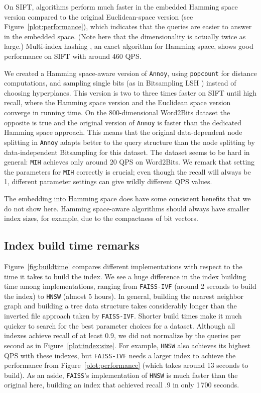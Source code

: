 On \textsf{SIFT}, algorithms perform much faster 
in the embedded Hamming space version compared to
the original Euclidean-space version (see Figure~\ref{plot:performance}), which indicates that the queries are 
easier to answer in the embedded space. (Note here that the dimensionality is actually twice as large.)  
Multi-index
hashing \cite{mihalgo}, an exact algorithm for Hamming space, shows good performance on \textsf{SIFT} with around 460 QPS.


We created a Hamming space-aware version of \texttt{Annoy}, using
\texttt{popcount} for distance computations, and sampling single bits 
(as in Bitsampling LSH \cite{IndykM98}) instead of choosing hyperplanes. This version is two to three times faster on \textsf{SIFT} until high recall, where the Hamming space version and the Euclidean space version converge in running time.  
On the 800-dimensional \textsf{Word2Bits} dataset the opposite is true and the original version of \texttt{Annoy} is faster than the dedicated Hamming space approach. This means that the original data-dependent node splitting in \texttt{Annoy} adapts better to the query structure than the node splitting by data-independent Bitsampling for this dataset. The dataset seems to be hard in general: \texttt{MIH} achieves only around 20 QPS on \textsf{Word2Bits}.
We remark that setting the parameters for \texttt{MIH} correctly is crucial;
even though the recall will always be 1, different parameter settings can give
wildly different QPS values.

The embedding into Hamming space does have some consistent benefits that we do
not show here. Hamming space-aware algorithms should always have smaller index
sizes, for example, due to the compactness of bit vectors.

\subsection{Index build time remarks}
\label{sec:build:time}

Figure~\ref{fig:buildtime} compares different implementations with respect to the time it takes to build the index. We see a huge difference in the index building time among implementations, ranging from \texttt{FAISS-IVF} (around 2 seconds to build the index) to \texttt{HNSW} (almost 5 hours). In general, building the nearest neighbor graph and building a tree data structure takes considerably longer than the inverted file approach taken by \texttt{FAISS-IVF}. Shorter build times make it much quicker to search for the best parameter choices for a dataset. Although all indexes achieve recall of at least 0.9, we did not normalize by the queries per second as in Figure~\ref{plot:index:size}. For example, \texttt{HNSW} also achieves its highest QPS with these indexes, but \texttt{FAISS-IVF} needs a larger index to achieve the performance from Figure~\ref{plot:performance} (which takes around 13 seconds to build).
As an aside, \texttt{FAISS}'s implementation of \texttt{HNSW} is much faster than the original here, building an index that achieved recall .9 in only 1\,700 seconds.

